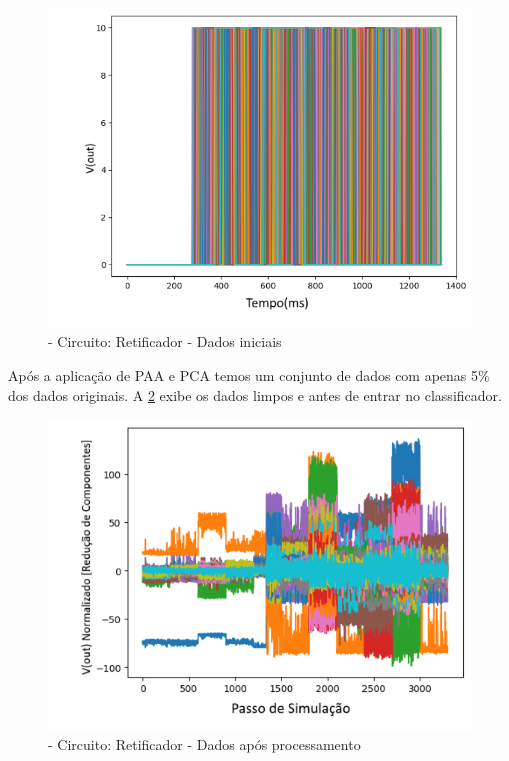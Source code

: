 \begin{figure}[H]
        \begin{center}
        \includegraphics[width=13cm]{./01_Pre_textuais/nonlin_figs/dadosPreProc_Nonlinear_Rectfier_+_4bit_PRBS_[FALHA]_-_300_-_02sraw.png}
        \caption{\label{fig:dadoPAAretificador}- Circuito: Retificador  - Dados iniciais}
        \end{center}
        \end{figure}
        
Após a aplicação de PAA e PCA temos um conjunto de dados com apenas 5\% dos dados originais. A \ref{fig:pcaretificador} exibe os dados limpos e antes de entrar no classificador.

\begin{figure}[H]
        \begin{center}
        \includegraphics[width=13cm]{./01_Pre_textuais/nonlin_figs/PCA_Nonlinear_Rectfier_+_4bit_PRBS_[FALHA]_-_300_-_02sraw.png}
        \caption{\label{fig:pcaretificador}- Circuito: Retificador - Dados após processamento}
        \end{center}
        \end{figure}

